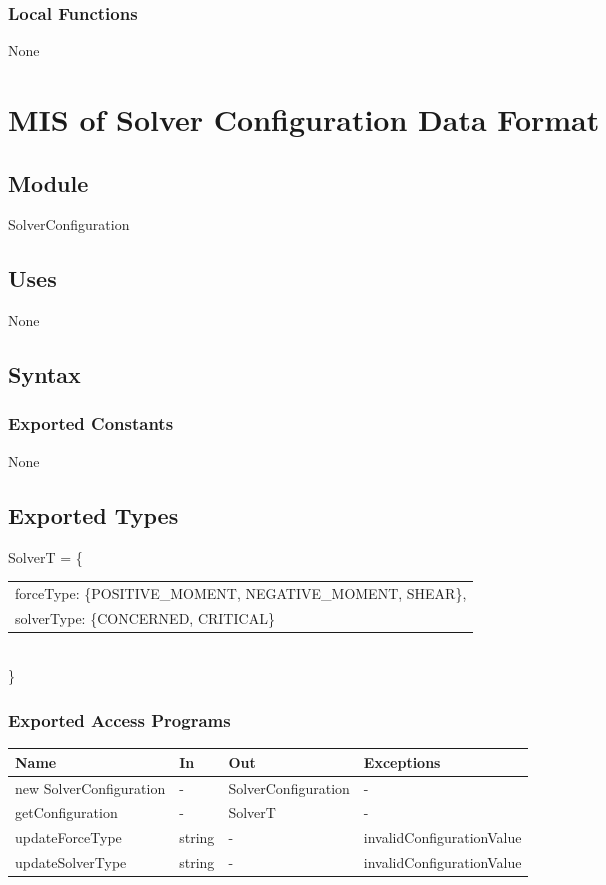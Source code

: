 \documentclass[12pt, titlepage]{article}
\begin{document}
\subsubsection{Local Functions}
None
\newpage

\section{MIS of Solver Configuration Data Format} \label{SolverConfiguration} 

\subsection{Module}

SolverConfiguration

\subsection{Uses}
None

\subsection{Syntax}

\subsubsection{Exported Constants}
None
\subsection{Exported Types}
SolverT = \{\\
    \begin{tabular}{l}
	forceType: \{POSITIVE\_MOMENT, NEGATIVE\_MOMENT,
		SHEAR\},\\
    solverType: \{CONCERNED,
		CRITICAL\}\\
    \end{tabular}
\\\}
\subsubsection{Exported Access Programs}
\begin{center}
\begin{tabular}{p{5cm} p{2cm} p{4cm} p{4cm}}
\hline
\textbf{Name} & \textbf{In} & \textbf{Out} & \textbf{Exceptions} \\
\hline
new SolverConfiguration & - & SolverConfiguration & - \\
\hline
getConfiguration & - & SolverT & - \\
\hline
updateForceType & string & - & invalidConfigurationValue \\
\hline

\hline
updateSolverType & string & - & invalidConfigurationValue \\
\hline

\end{tabular}
\end{center}
\end{document}
